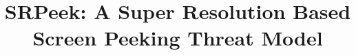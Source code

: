 \documentclass[10pt, conference, letterpaper]{IEEEtran}
\begin{document}
\title{SRPeek: A Super Resolution Based Screen Peeking Threat Model}




\maketitle





















\end{document}
